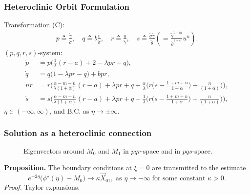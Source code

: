 \documentclass{beamer}
\def\tg{{\tilde{\gamma}}}
\def\tv{{\tilde{v}}}
\def\tth{{\tilde{\theta}}}
\def\ts{{\tilde{\sigma}}}
\def\tu{{\tilde{u}}}
\begin{document}
\begin{frame}
 \frametitle{Heteroclinic Orbit Formulation}
 Transformation (C): 
\begin{equation}\label{eq:pqrdef}
 \begin{aligned}
  p \triangleq \frac{\tg}{\ts}, \quad q \triangleq  b \frac{\tv}{\ts},  \quad r \triangleq  \frac{\tu}{\tg}, \quad s \triangleq  \frac{\ts\tg}{\tth}\left(=\frac{\tg^{1+m}}{\tth^{1+\alpha}}u^n\right).
 \end{aligned}
\end{equation}
$(p,q,r,s)$-system:{\scriptsize
\begin{equation}\label{eq:slow}
 \begin{aligned}
 \dot{p} &=p\Big(\frac{1}{\lambda}(r-a) + 2- \lambda p r -q\Big),\\
 \dot{q} &=q\Big(1 -\lambda p r -q\Big) + b p r,\\
 n\dot{r} &=r\Big(\frac{\alpha-m-n}{\lambda(1+\alpha)}(r-a) + \lambda pr + q +\frac{\alpha}{\lambda}\Big(r\big(s- \frac{1+m+n}{1+\alpha}\big) + \frac{n}{(1+\alpha)}\Big)\Big),\\
 \dot{s} &=s\Big(\frac{\alpha-m-n}{\lambda(1+\alpha)}(r-a) + \lambda pr + q - \frac{1}{\lambda}\Big(r\big(s- \frac{1+m+n}{1+\alpha}\big) + \frac{n}{(1+\alpha)}\Big)\Big),
 \end{aligned}
\end{equation}}
$\eta\in (-\infty,\infty)$, and B.C. as $\eta \rightarrow \pm \infty$.
\end{frame}

\begin{frame}
\frametitle{Solution as a heteroclinic connection}%
\begin{figure}
 \centering
  \subfigure[$pqr$-space]{
  \psfrag{r}{\scriptsize$r$}%
  \texttt{[image: equilibriapqr.eps]}\label{fig:eq1}
  }
  \quad 
  \subfigure[$pqs$-space]{
  \psfrag{r}{\scriptsize$s-\frac{1+m}{1+\alpha}$}%
  \texttt{[image: equilibriapqs.eps]}\label{fig:eq2}
  }
  \caption{Eigenvectors around $M_0$ and $M_1$ in $pqr$-space and in $pqs$-space.} \label{fig:equilibria}
\end{figure}
{\bf Proposition.} The boundary conditions at $\xi=0$ are transmitted to the estimate
 $$e^{-2\eta}\Big(\phi^\star(\eta)- M_0\Big) \rightarrow \kappa\vec{X}_{01}, \; \text{as $\eta \rightarrow -\infty$} \;
\text{for some constant $\kappa>0$}.$$
 {\it Proof.} Taylor expansions.
\end{frame}
\end{document}
